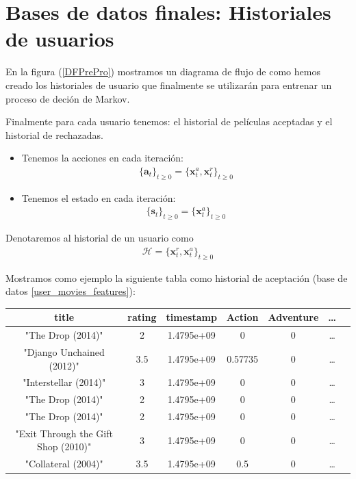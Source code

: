    


\section{Bases de datos finales: Historiales de usuarios}\label{HObt}


En la figura (\ref{DFPrePro}) mostramos un diagrama de flujo de como hemos creado los historiales de usuario que finalmente se utilizarán para entrenar un proceso de deción de Markov. 

Finalmente para cada usuario tenemos: el historial de películas aceptadas y el historial de rechazadas.
\begin{itemize}
    \item Tenemos la acciones en cada iteración: 
    \begin{gather}
        \{\bm{a}_t\}_{t\geq 0} =\{ \bm{x}_t^a,\bm{x}_t^r\}_{t\geq 0}
    \end{gather}

    \item Tenemos el estado en cada iteración: 
    \begin{gather}
        \{\bm{s}_t\}_{t\geq 0} = \{ \bm{x}_t^a\}_{t \geq 0}
    \end{gather}

    
\end{itemize}

Denotaremos al historial de un usuario como 
\begin{gather}
    \mathcal{H} = \{ \bm{x}_t^r,\bm{x}_t^a\}_{t \geq 0}
\end{gather}
 
Mostramos como ejemplo la siguiente tabla como historial de aceptación (base de datos \ref{user_movies_features}):
\begin{center}
    \begin{tabular}{|c|c|c|c|c|c|c|}
\hline
\textbf{title}          &              \textbf{rating}  &  \textbf{timestamp}   &    \textbf{Action}   &  \textbf{Adventure} & \dots \\
\hline
"The Drop (2014)"                   &      2   &   1.4795e+09  &       0        & 0  & \dots \\  
"Django Unchained (2012)"           &    3.5   &   1.4795e+09  &       0.57735  & 0  & \dots \\ 
"Interstellar (2014)"               &      3   &   1.4795e+09  &       0        & 0  & \dots \\  
"The Drop (2014)"                   &      2   &   1.4795e+09  &       0        & 0  & \dots \\  
"The Drop (2014)"                   &      2   &   1.4795e+09  &       0        & 0  & \dots \\  
"Exit Through the Gift Shop (2010)" &      3   &   1.4795e+09  &       0        & 0  & \dots \\  
"Collateral (2004)"                 &    3.5   &   1.4795e+09  &       0.5      & 0  & \dots \\  
    \hline
    \end{tabular}
\end{center}

